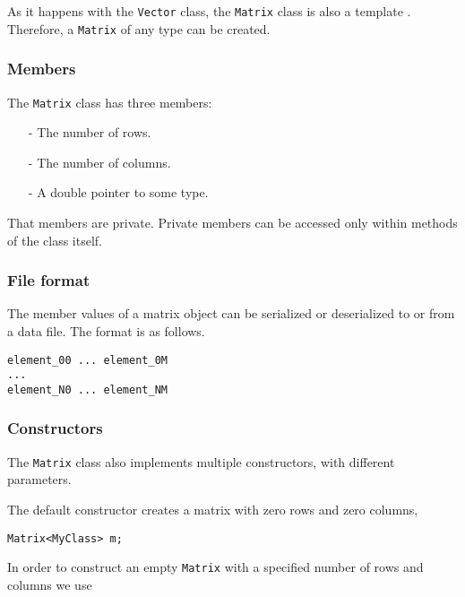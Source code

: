 
As it happens with the \lstinline"Vector" class, the \lstinline"Matrix" class is also a template \cite{Eckel2000}. 
Therefore, a \lstinline"Matrix" of any type can be created. 

\subsubsection*{Members}

The \lstinline"Matrix" class has three members:

\begin{itemize}
\item[-] The number of rows. 
\item[-] The number of columns. 
\item[-] A double pointer to some type. 
\end{itemize}

That members are private. Private members can be accessed only within methods of the class itself.

\subsubsection*{File format}

The member values of a matrix object can be serialized or deserialized to or from a data file. 
The format is as follows. 

\begin{lstlisting}
element_00 ... element_0M
...
element_N0 ... element_NM
\end{lstlisting}

\subsubsection*{Constructors}

The \lstinline"Matrix" class also implements multiple constructors, with different parameters.


The default constructor creates a matrix with zero rows and zero columns, 

\begin{lstlisting}
Matrix<MyClass> m;
\end{lstlisting}


In order to construct an empty \lstinline"Matrix" with a specified number of rows and columns we use

